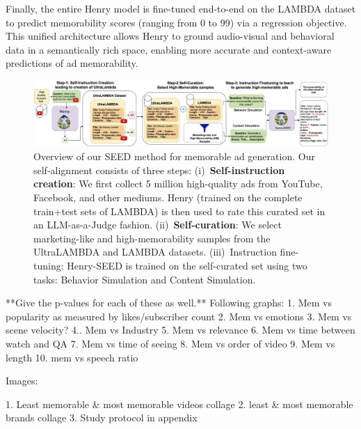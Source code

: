 Finally, the entire Henry model is fine-tuned end-to-end on the LAMBDA dataset to predict memorability scores (ranging from 0 to 99) via a regression objective. This unified architecture allows Henry to ground audio-visual and behavioral data in a semantically rich space, enabling more accurate and context-aware predictions of ad memorability.









\begin{landscape}
    \begin{figure}
    \centering
    \includegraphics[width=1.6\textwidth]{images/seed-2.jpg}
    \caption{Overview of our SEED method for memorable ad generation. Our self-alignment consists of three steps: (i)~\textbf{Self-instruction creation}: We first collect 5 million high-quality ads from YouTube, Facebook, and other mediums. Henry (trained on the complete train+test sets of LAMBDA) is then used to rate this curated set in an LLM-as-a-Judge fashion. (ii)~\textbf{Self-curation}: We select marketing-like and high-memorability samples from the UltraLAMBDA and LAMBDA datasets. (iii)~Instruction fine-tuning: Henry-SEED is trained on the self-curated set using two tasks: Behavior Simulation and Content Simulation. 
    \label{fig:Henry-SEED}}    
\end{figure}
\end{landscape}


\iffalse
**Give the p-values for each of these as well.**
Following graphs:
1. Mem vs popularity as measured by likes/subscriber count
2. Mem vs emotions
3. Mem vs scene velocity?
4.. Mem vs Industry
5. Mem vs relevance
6. Mem vs time between watch and QA
7. Mem vs time of seeing
8. Mem vs order of video
9. Mem vs length
10. mem vs speech ratio




Images:

1. Least memorable & most memorable videos collage
2. least & most memorable brands collage
3. Study protocol in appendix



